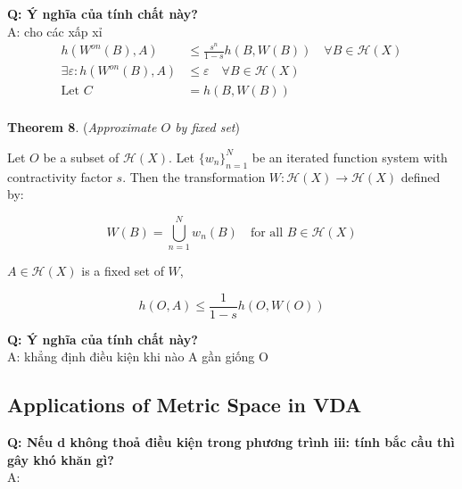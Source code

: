 \textbf{Q: Ý nghĩa của tính chất này?}\\
A: cho các xấp xỉ 
\begin{align*}
h(W^{on}(B), A) &\leq \frac{s^n}{1 - s} h(B, W(B)) \quad \forall B \in \mathcal{H}(X)\\
\exists \varepsilon: h(W^{on}(B), A) &\leq \varepsilon \quad \forall B \in \mathcal{H}(X)\\
\textrm{Let } C &= h(B, W(B))\\
\end{align*}

\textbf{Theorem 8}. (\textit{Approximate \(O\) by fixed set})

Let \(O\) be a subset of \(\mathcal{H}(X)\). Let \(\{w_n\}_{n=1}^N\) be an iterated function system with contractivity factor \(s\). Then the transformation \(W: \mathcal{H}(X) \rightarrow \mathcal{H}(X)\) defined by:

\[
W(B) = \bigcup_{n=1}^N w_n(B) \quad \text{for all } B \in \mathcal{H}(X)
\]

\(A \in \mathcal{H}(X)\) is a fixed set of \(W\),

\[
h(O, A) \leq \frac{1}{1 - s} h(O, W(O))
\]

\textbf{Q: Ý nghĩa của tính chất này?}\\
A: khẳng định điều kiện khi nào A gần giống O

\pagebreak
\subsection{Applications of Metric Space in VDA}














\textbf{Q: Nếu d không thoả điều kiện trong phương trình iii: tính bắc cầu  thì gây khó khăn gì?}\\
A: 


